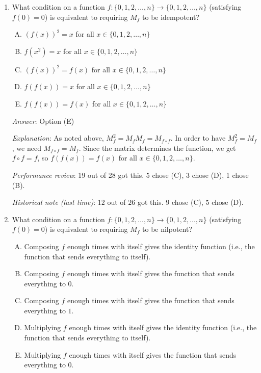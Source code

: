 \documentclass[10pt]{amsart}
\begin{document}
\begin{enumerate}
\item What condition on a function $f: \{ 0,1,2,\dots, n\} \to \{
  0,1,2,\dots,n\}$ (satisfying $f(0) = 0$) is equivalent to requiring
  $M_f$ to be idempotent?

  \begin{enumerate}[(A)]
  \item $(f(x))^2 = x$ for all $x \in \{ 0,1,2,\dots,n\}$
  \item $f(x^2) = x$ for all $x \in \{ 0,1,2,\dots,n \}$
  \item $(f(x))^2 = f(x)$ for all $x \in \{ 0,1,2,\dots,n\}$
  \item $f(f(x)) = x$ for all $x \in \{ 0,1,2,\dots,n\}$
  \item $f(f(x)) = f(x)$ for all $x \in \{0,1,2,\dots,n \}$
  \end{enumerate}

  {\em Answer}: Option (E)

  {\em Explanation}: As noted above, $M_f^2 = M_fM_f = M_{f \circ
    f}$. In order to have $M_f^2 = M_f$, we need $M_{f \circ f} =
  M_f$. Since the matrix determines the function, we get $f \circ f =
  f$, so $f(f(x)) = f(x)$ for all $x \in \{ 0,1,2,\dots,n \}$.

  {\em Performance review}: 19 out of 28 got this. 5 chose (C), 3
  chose (D), 1 chose (B).

  {\em Historical note (last time)}: $12$ out
  of $26$ got this. $9$ chose (C), $5$ chose (D).

\item What condition on a function $f: \{ 0,1,2,\dots, n\} \to \{
  0,1,2,\dots,n\}$ (satisfying $f(0) = 0$) is equivalent to requiring
  $M_f$ to be nilpotent?

  \begin{enumerate}[(A)]
  \item Composing $f$ enough times with itself gives the identity
    function (i.e., the function that sends everything to itself).
  \item Composing $f$ enough times with itself gives the function that
    sends everything to $0$.
  \item Composing $f$ enough times with itself gives the function that
    sends everything to $1$.
  \item Multiplying $f$ enough times with itself gives the identity
    function (i.e., the function that sends everything to itself).
  \item Multiplying $f$ enough times with itself gives the function
    that sends everything to $0$.
  \end{enumerate}


\end{enumerate}
\end{document}
